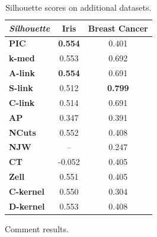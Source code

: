 \begin{table}[h]
    \centering
    \begin{tabular}{|l|c|c|}
        \hline
        \textit{Silhouette} & \textbf{Iris} & \textbf{Breast Cancer} \\
        \hline
        \textbf{PIC}       & \textbf{0.554} & 0.401 \\ \hline
        \textbf{k-med}     & 0.553 & 0.692 \\ \hline
        \textbf{A-link}    & \textbf{0.554} & 0.691 \\ \hline
        \textbf{S-link}    & 0.512 & \textbf{0.799} \\ \hline
        \textbf{C-link}    & 0.514 & 0.691 \\ \hline
        \textbf{AP}        & 0.347 & 0.391 \\ \hline
        \textbf{NCuts}     & 0.552 & 0.408 \\ \hline
        \textbf{NJW}       & -- & 0.247 \\ \hline
        \textbf{CT}        & -0.052 & 0.405 \\ \hline
        \textbf{Zell}      & 0.551 & 0.405 \\ \hline
        \textbf{C-kernel}  & 0.550 & 0.304 \\ \hline
        \textbf{D-kernel}  & 0.553 & 0.408 \\
        \hline
        \end{tabular}
    \caption{Silhouette scores on additional datasets.}
    \label{table:silhouette_additional}
\end{table}

Comment results.

